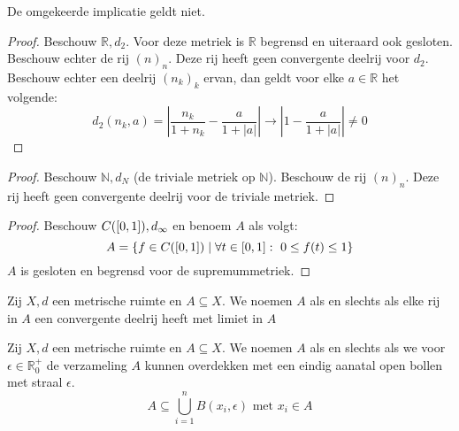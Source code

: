 \documentclass[main.tex]{subfiles}
\begin{document}
\begin{tvb}
  De omgekeerde implicatie geldt niet.

  \begin{proof}
    Beschouw $\mathbb{R},d_{2}$.
    Voor deze metriek is $\mathbb{R}$ begrensd en uiteraard ook gesloten.
    Beschouw echter de rij $(n)_{n}$.
    Deze rij heeft geen convergente deelrij voor $d_{2}$.
    Beschouw echter een deelrij $(n_{k})_{k}$ ervan, dan geldt voor elke $a\in \mathbb{R}$ het volgende:
    \[ d_{2}(n_{k},a) = \left| \frac{n_{k}}{1+n_{k}} - \frac{a}{1+|a|} \right| \rightarrow \left|1-\frac{a}{1+|a|}\right| \neq 0 \]
  \end{proof}
  \begin{proof}
    Beschouw $\mathbb{N},d_{N}$ (de triviale metriek op $\mathbb{N}$).
    Beschouw de rij $(n)_{n}$.
    Deze rij heeft geen convergente deelrij voor de triviale metriek.
  \end{proof}
  \begin{proof}
    Beschouw $C(\interval{0}{1}),d_{\infty}$ en benoem $A$ als volgt:
    \[ A = \{ f\in C(\interval{0}{1}) \mid \forall t\in \interval{0}{1}:\ 0 \le f(t) \le 1 \} \]
    $A$ is gesloten en begrensd voor de supremummetriek.
  \end{proof}
\end{tvb}

\begin{de}
  Zij $X,d$ een metrische ruimte en $A \subseteq X$.
  We noemen $A$  als en slechts als elke rij in $A$ een convergente deelrij heeft met limiet in $A$
\end{de}

\begin{de}
  Zij $X,d$ een metrische ruimte en $A \subseteq X$.
  We noemen $A$  als en slechts als we voor $\epsilon \in \mathbb{R}_{0}^{+}$ de verzameling $A$ kunnen overdekken met een eindig aanatal open bollen met straal $\epsilon$.
  \[ A \subseteq \bigcup_{i=1}^{n}B(x_{i},\epsilon) \text{ met } x_{i} \in A \]
\end{de}
\end{document}

